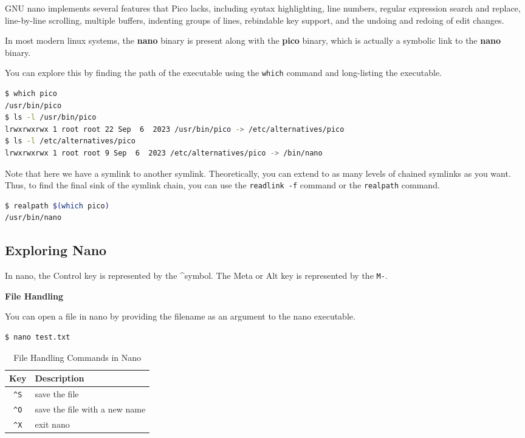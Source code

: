 GNU nano implements several features that Pico lacks,
including syntax highlighting, line numbers,
regular expression search and replace,
line-by-line scrolling, multiple buffers,
indenting groups of lines, rebindable key support,
and the undoing and redoing of edit changes.

In most modern linux systems, the \textbf{nano}
binary is present along with the \textbf{pico}
binary, which is actually a symbolic link to the
\textbf{nano} binary.

You can explore this by finding the path of the
executable using the \lstinline|which| command
and long-listing the executable.

\begin{lstlisting}[language=bash]
$ which pico
/usr/bin/pico
$ ls -l /usr/bin/pico
lrwxrwxrwx 1 root root 22 Sep  6  2023 /usr/bin/pico -> /etc/alternatives/pico
$ ls -l /etc/alternatives/pico
lrwxrwxrwx 1 root root 9 Sep  6  2023 /etc/alternatives/pico -> /bin/nano
\end{lstlisting}

\begin{remark}
  Note that here we have a symlink to another symlink.
  Theoretically, you can extend to as many levels of
  chained symlinks as you want.
  Thus, to find the final sink of the symlink chain,
  you can use the \lstinline|readlink -f| command or
  the \lstinline|realpath| command.
\end{remark}

\begin{lstlisting}[language=bash]
$ realpath $(which pico)
/usr/bin/nano
\end{lstlisting}

\subsection{Exploring Nano}

In nano, the Control key is represented by the \textasciicircum symbol.
The Meta or Alt key is represented by the \lstinline|M-|.

\textbf{File Handling}

You can open a file in nano by providing the filename
as an argument to the nano executable.

\begin{lstlisting}[language=bash]
$ nano test.txt
\end{lstlisting}

\begin{table}[h!]
  \caption{File Handling Commands in Nano}
  \begin{tabular}{c l}
    \toprule
    Key & Description \\
    \midrule
    \lstinline|^S| & save the file \\
    \lstinline|^O| & save the file with a new name \\
    \lstinline|^X| & exit nano \\
    \bottomrule
  \end{tabular}
\end{table}


